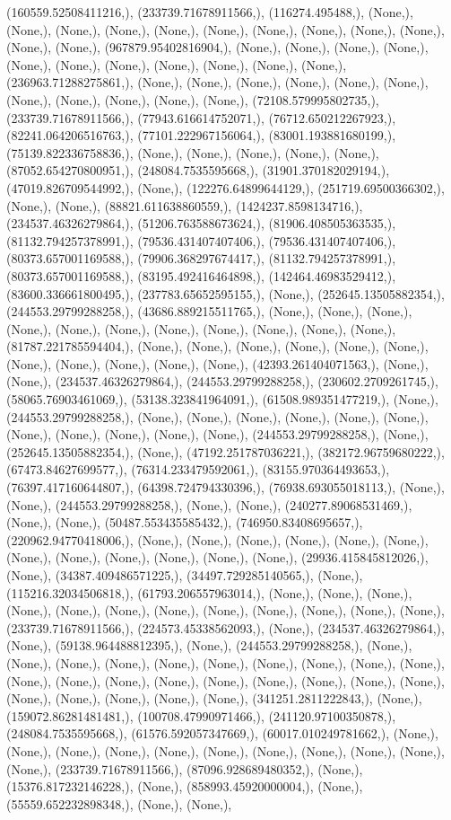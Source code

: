 \documentclass{article}
\begin{document}
(160559.52508411216,), (233739.71678911566,), (116274.495488,), (None,), (None,), (None,), (None,), (None,), (None,), (None,), (None,), (None,), (None,), (None,), (None,), (967879.95402816904,), (None,), (None,), (None,), (None,), (None,), (None,), (None,), (None,), (None,), (None,), (None,), (236963.71288275861,), (None,), (None,), (None,), (None,), (None,), (None,), (None,), (None,), (None,), (None,), (None,), (72108.579995802735,), (233739.71678911566,), (77943.616614752071,), (76712.650212267923,), (82241.064206516763,), (77101.222967156064,), (83001.193881680199,), (75139.822336758836,), (None,), (None,), (None,), (None,), (None,), (87052.654270800951,), (248084.7535595668,), (31901.370182029194,), (47019.826709544992,), (None,), (122276.64899644129,), (251719.69500366302,), (None,), (None,), (88821.611638860559,), (1424237.8598134716,), (234537.46326279864,), (51206.763588673624,), (81906.408505363535,), (81132.794257378991,), (79536.431407407406,), (79536.431407407406,), (80373.657001169588,), (79906.368297674417,), (81132.794257378991,), (80373.657001169588,), (83195.492416464898,), (142464.46983529412,), (83600.336661800495,), (237783.65652595155,), (None,), (252645.13505882354,), (244553.29799288258,), (43686.889215511765,), (None,), (None,), (None,), (None,), (None,), (None,), (None,), (None,), (None,), (None,), (None,), (81787.221785594404,), (None,), (None,), (None,), (None,), (None,), (None,), (None,), (None,), (None,), (None,), (None,), (42393.261404071563,), (None,), (None,), (234537.46326279864,), (244553.29799288258,), (230602.2709261745,), (58065.76903461069,), (53138.323841964091,), (61508.989351477219,), (None,), (244553.29799288258,), (None,), (None,), (None,), (None,), (None,), (None,), (None,), (None,), (None,), (None,), (None,), (244553.29799288258,), (None,), (252645.13505882354,), (None,), (47192.251787036221,), (382172.96759680222,), (67473.84627699577,), (76314.233479592061,), (83155.970364493653,), (76397.417160644807,), (64398.724794330396,), (76938.693055018113,), (None,), (None,), (244553.29799288258,), (None,), (None,), (240277.89068531469,), (None,), (None,), (50487.553435585432,), (746950.83408695657,), (220962.94770418006,), (None,), (None,), (None,), (None,), (None,), (None,), (None,), (None,), (None,), (None,), (None,), (None,), (29936.415845812026,), (None,), (34387.409486571225,), (34497.729285140565,), (None,), (115216.32034506818,), (61793.206557963014,), (None,), (None,), (None,), (None,), (None,), (None,), (None,), (None,), (None,), (None,), (None,), (None,), (233739.71678911566,), (224573.45338562093,), (None,), (234537.46326279864,), (None,), (59138.964488812395,), (None,), (244553.29799288258,), (None,), (None,), (None,), (None,), (None,), (None,), (None,), (None,), (None,), (None,), (None,), (None,), (None,), (None,), (None,), (None,), (None,), (None,), (None,), (None,), (None,), (None,), (None,), (None,), (341251.2811222843,), (None,), (159072.86281481481,), (100708.47990971466,), (241120.97100350878,), (248084.7535595668,), (61576.592057347669,), (60017.010249781662,), (None,), (None,), (None,), (None,), (None,), (None,), (None,), (None,), (None,), (None,), (None,), (233739.71678911566,), (87096.928689480352,), (None,), (15376.817232146228,), (None,), (858993.45920000004,), (None,), (55559.652232898348,), (None,), (None,), 
\end{document}
